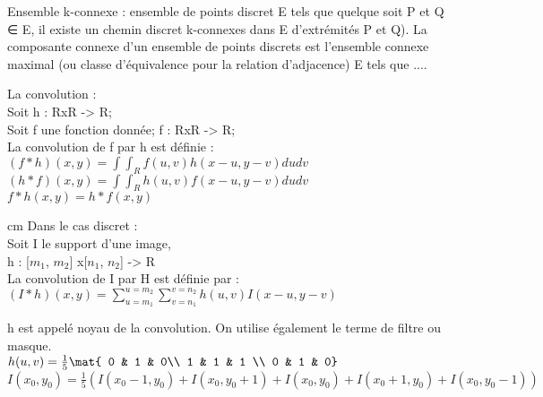 \documentclass[11pt]{cours}
\begin{document}
Ensemble k-connexe : ensemble de points discret E tels que quelque soit P et Q ∈ E, il existe un chemin discret k-connexes dans E d'extrémités P et Q). La composante connexe d'un ensemble de points discrets est l'ensemble connexe maximal (ou classe d'équivalence pour la relation d'adjacence) E tels que ....
\vskip 1cm

La convolution : \\
Soit h : RxR -> R;\\
Soit f une fonction donnée; f : RxR -> R;\\
La convolution de f par h est définie : \\
$(f * h)(x, y) = \int \int_R f(u, v)h(x-u, y - v) dudv$\\
$(h * f)(x, y) = \int \int_R h(u,v)f(x - u, y -v ) du dv$\\
$f * h(x, y) = h * f(x, y)$

 cm
Dans le cas discret :\\
Soit I le support d'une image, \\
h : [$m_1$, $m_2$] x[$n_1$, $n_2$] -> R\\

La convolution de I par H est définie par :\\
$(I * h)(x, y) = \sum^{u=m_2}_{u=m_1}\sum^{v=n_2}_{v=n_1} h(u, v)I(x- u, y-v)$

h est appelé noyau de la convolution. On utilise également le terme de filtre ou masque.\\

$h(u, v) = \frac{1}{5}\mat { 0 & 1 & 0\\ 1 & 1 & 1 \\ 0 & 1 & 0}$\\
$I(x_0, y_0) = \frac{1}{5}(
I(x_0 -1, y_0) + I(x_0, y_0+1) + I(x_0, y_0) + I(x_0 +1, y_0) + I(x_0, y_0 -1))$



\vskip 2cm
\end{document}
